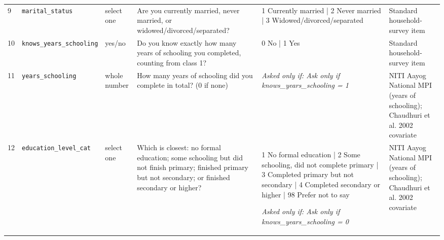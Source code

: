 \documentclass[9pt,a4paper,landscape]{article}
\begin{document}
\begin{longtable}{@{}p{0.5cm}p{3.3cm}p{1.7cm}p{7.3cm}p{5.6cm}p{5.4cm}@{}}
\footnotesize 9 & \footnotesize\texttt{marital\_status} & \scriptsize select one & \footnotesize Are you currently married, never married, or widowed/divorced/separated?\par\vspace{1pt}{\footnotesize\color{hdr}{\hifont क्या आपकी शादी हुई है, नहीं हुई है, या आप विधवा/विधुर या अलग हैं?}} & \scriptsize 1 Currently married | 2 Never married | 3 Widowed/divorced/separated & \scriptsize Standard household-survey item\\
\footnotesize 10 & \footnotesize\texttt{knows\_years\_schooling} & \scriptsize yes/no & \footnotesize Do you know exactly how many years of schooling you completed, counting from class 1?\par\vspace{1pt}{\footnotesize\color{hdr}{\hifont क्या आपको ठीक-ठीक याद है कि आपने कितने साल पढ़ाई की, कक्षा 1 से गिनकर?}} & \scriptsize 0 No | 1 Yes & \scriptsize Standard household-survey item\\
\footnotesize 11 & \footnotesize\texttt{years\_schooling} & \scriptsize whole number & \footnotesize How many years of schooling did you complete in total? (0 if none)\par\vspace{1pt}{\footnotesize\color{hdr}{\hifont आपने कुल कितने साल पढ़ाई की? (अगर बिल्कुल नहीं पढ़े तो 0)}} & \scriptsize \textit{Asked only if: Ask only if knows\_years\_schooling = 1} & \scriptsize NITI Aayog National MPI (years of schooling); Chaudhuri et al. 2002 covariate\\
\footnotesize 12 & \footnotesize\texttt{education\_level\_cat} & \scriptsize select one & \footnotesize Which is closest: no formal education; some schooling but did not finish primary; finished primary but not secondary; or finished secondary or higher?\par\vspace{1pt}{\footnotesize\color{hdr}{\hifont इनमें से कौन सा सबसे नज़दीक है: बिल्कुल नहीं पढ़े; थोड़ा पढ़े पर प्राइमरी पूरी नहीं की; प्राइमरी पूरी की पर दसवीं नहीं; या दसवीं या उससे ज़्यादा?}} & \scriptsize 1 No formal education | 2 Some schooling, did not complete primary | 3 Completed primary but not secondary | 4 Completed secondary or higher | 98 Prefer not to say\par\vspace{1pt}\textit{Asked only if: Ask only if knows\_years\_schooling = 0} & \scriptsize NITI Aayog National MPI (years of schooling); Chaudhuri et al. 2002 covariate\\

\end{longtable}
\end{document}
